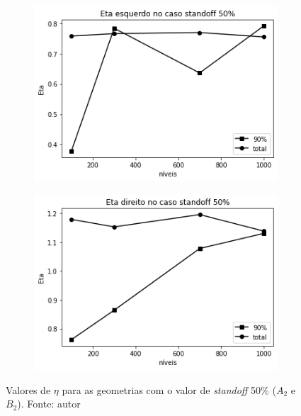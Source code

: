     \begin{figure}[H]
        \centering
        \begin{subfigure}[b]{0.42\linewidth}
    		\includegraphics[width=\linewidth]{img/eta/eta_esquerdo_standoff.png}
    	\end{subfigure}
    	\begin{subfigure}[b]{0.42\linewidth}
    		\includegraphics[width=\linewidth]{img/eta/eta_direito_standoff.png}
    	\end{subfigure}
    	\caption{Valores de $\eta$ para as geometrias com o valor de \textit{standoff} 50\%  ($A_2$ e $B_2$). Fonte: autor}
    	\label{fig:eta_standoff}
    \end{figure}
